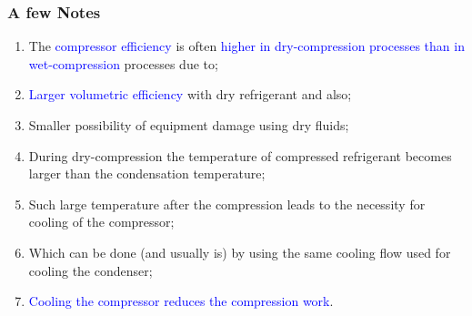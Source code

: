 \documentclass[10pt,compress]{beamer}
\begin{document}
\begin{frame}
 \frametitle{A few Notes}
\begin{enumerate}
\item <1-> The \textcolor{blue}{compressor efficiency} is often \textcolor{blue}{higher in dry-compression processes than in wet-compression} processes due to;
\item <2-> \textcolor{blue}{Larger volumetric efficiency} with dry refrigerant and also;
\item <3-> Smaller possibility of equipment damage using dry fluids;
\item <4-> During dry-compression the temperature of compressed refrigerant becomes larger than the condensation temperature;
\item <5-> Such large temperature after the compression leads to the necessity for cooling of the compressor;
\item <6-> Which can be done (and usually is) by using the same cooling flow used for cooling the condenser;
\item <7-> \textcolor{blue}{Cooling the compressor reduces the compression work}.
\end{enumerate}
\end{frame}
\end{document}

